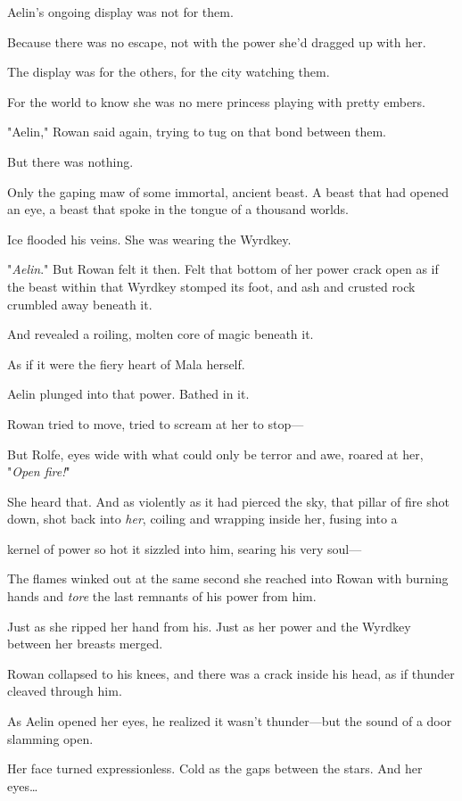 Aelin's ongoing display was not for them.

Because there was no escape, not with the power she'd dragged up with her.

The display was for the others, for the city watching them.

For the world to know she was no mere princess playing with pretty embers.

"Aelin," Rowan said again, trying to tug on that bond between them.

But there was nothing.

Only the gaping maw of some immortal, ancient beast. A beast that had opened an eye, a beast that spoke in the tongue of a thousand worlds.

Ice flooded his veins. She was wearing the Wyrdkey.

"\emph{Aelin}." But Rowan felt it then. Felt that bottom of her power crack open as if the beast within that Wyrdkey stomped its foot, and ash and crusted rock crumbled away beneath it.

And revealed a roiling, molten core of magic beneath it.

As if it were the fiery heart of Mala herself.

Aelin plunged into that power. Bathed in it.

Rowan tried to move, tried to scream at her to stop---

But Rolfe, eyes wide with what could only be terror and awe, roared at her, "\emph{Open fire!}"

She heard that. And as violently as it had pierced the sky, that pillar of fire shot down, shot back into \emph{her}, coiling and wrapping inside her, fusing into a

kernel of power so hot it sizzled into him, searing his very soul---

The flames winked out at the same second she reached into Rowan with burning hands and \emph{tore} the last remnants of his power from him.

Just as she ripped her hand from his. Just as her power and the Wyrdkey between her breasts merged.

Rowan collapsed to his knees, and there was a crack inside his head, as if thunder cleaved through him.

As Aelin opened her eyes, he realized it wasn't thunder---but the sound of a door slamming open.

Her face turned expressionless. Cold as the gaps between the stars. And her eyes\ldots{}

